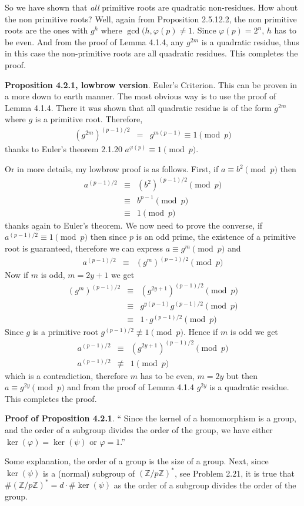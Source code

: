 \documentclass[aps,preprint,preprintnumbers,nofootinbib,showpacs,prd]{revtex4-1}
\newcommand{\nbea}{\begin{eqnarray*}}
\newcommand{\neea}{\end{eqnarray*}}
\begin{document}
So we have shown that {\it all} primitive roots are quadratic non-residues. How about the non primitive roots? Well, again from Proposition 2.5.12.2, the non primitive roots are the ones with $g^h$ where $\gcd(h, \varphi(p) \neq 1$. Since $\varphi(p) = 2^n$, $h$ has to be even. And from the proof of Lemma 4.1.4, any $g^{2m}$ is a quadratic residue, thus in this case the non-primitive roots are all quadratic residues. This completes the proof.

{\bf Proposition 4.2.1, lowbrow version}. Euler's Criterion. This can be proven in a more down to earth manner. The most obvious way is to use the proof of Lemma 4.1.4. There it was shown that all quadratic residue is of the form $g^{2m}$ where $g$ is a primitive root. Therefore,
%
\nbea
(g^{2m})^{(p-1)/2} & = & g^{m(p-1)} \equiv 1 \pmod{p}
\neea
%
thanks to Euler's theorem 2.1.20 $a^{\varphi(p)} \equiv 1 \pmod{p}$.

Or in more details, my lowbrow proof is as follows. First, if $a \equiv b^2 \pmod{p}$ then
%
\nbea
a^{(p-1)/2} & \equiv & (b^2)^{(p-1)/2} \pmod{p} \\
& \equiv & b^{p-1} \pmod{p} \\
& \equiv & 1 \pmod{p}
\neea
%
thanks again to Euler's theorem. We now need to prove the converse, if $a^{(p-1)/2} \equiv 1 \pmod{p}$ then since $p$ is an odd prime, the existence of a primitive root is guaranteed, therefore we can express $a \equiv g^{m} \pmod{p}$ and
%
\nbea
a^{(p-1)/2} & \equiv & (g^m)^{(p-1)/2} \pmod{p}
\neea
%
Now if $m$ is odd, $m = 2y+1$ we get
%
\nbea
(g^m)^{(p-1)/2} & \equiv & (g^{2y+1})^{(p-1)/2} \pmod{p} \\
& \equiv & g^{y(p-1)} g^{(p-1)/2} \pmod{p} \\
& \equiv & 1 \cdot g^{(p-1)/2} \pmod{p}
\neea
%
Since $g$ is a primitive root $g^{(p-1)/2} \not\equiv 1 \pmod{p}$. Hence if $m$ is odd we get
%
\nbea
a^{(p-1)/2} & \equiv & (g^{2y+1})^{(p-1)/2} \pmod{p} \\
a^{(p-1)/2} & \not\equiv & 1 \pmod{p}
\neea
%
which is a contradiction, therefore $m$ has to be even, $m=2y$ but then $a \equiv g^{2y} \pmod{p}$ and from the proof of Lemma 4.1.4 $g^{2y}$ is a quadratic residue. This completes the proof.

{\bf Proof of Proposition 4.2.1}. `` Since the kernel of a homomorphism is a group, and the order of a subgroup divides the order of the group, we have either $\ker(\varphi) = \ker(\psi)$ or $\varphi = 1$.''

Some explanation, the order of a group is the size of a group. Next, since $\ker(\psi)$ is a (normal) subgroup of $(\mathbb{Z}/p\mathbb{Z})^*$, see Problem 2.21, it is true that $\#(\mathbb{Z}/p\mathbb{Z})^* = d \cdot \#\ker(\psi)$ as the order of a subgroup divides the order of the group.
\end{document}
